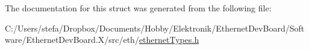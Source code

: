 The documentation for this struct was generated from the following file\+:\begin{DoxyCompactItemize}
\item 
C\+:/\+Users/stefa/\+Dropbox/\+Documents/\+Hobby/\+Elektronik/\+Ethernet\+Dev\+Board/\+Software/\+Ethernet\+Dev\+Board.\+X/src/eth/\mbox{\hyperlink{ethernet_types_8h}{ethernet\+Types.\+h}}\end{DoxyCompactItemize}

